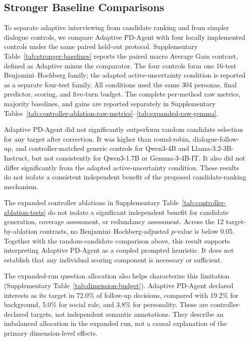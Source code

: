 \documentclass{ieeeaccess}
\begin{document}
\subsection{Stronger Baseline Comparisons}
To separate adaptive interviewing from candidate ranking and from simpler dialogue controls, we
compare Adaptive PD-Agent with four locally implemented controls under the same paired
held-out protocol. Supplementary Table~\ref{tab:stronger-baselines} reports the paired macro Average Gain
contrast, defined as Adaptive minus the comparator. The four controls form one
16-test Benjamini--Hochberg family; the adapted active-uncertainty condition is reported as a
separate four-test family. All conditions used the same 304 personas, final predictor, scoring,
and five-turn budget. The complete per-method raw metrics, majority baselines, and gains
are reported separately in Supplementary
Tables~\ref{tab:controller-ablation-raw-metrics}--\ref{tab:expanded-raw-gemma}.

Adaptive PD-Agent did not significantly outperform random candidate selection for any target
after correction. It was higher than round-robin, dialogue-follow-up, and
controller-matched generic controls for Qwen3-4B and Llama-3.2-3B-Instruct, but not
consistently for Qwen3-1.7B or Gemma-3-4B-IT. It also did not differ significantly from the
adapted active-uncertainty condition. These results do not isolate a consistent independent
benefit of the proposed candidate-ranking mechanism.

The expanded controller ablations in Supplementary Table~\ref{tab:controller-ablation-tests}
do not isolate a significant independent benefit for
candidate generation, coverage assessment, or redundancy assessment. Across the 12
target-by-ablation contrasts, no Benjamini--Hochberg-adjusted $p$-value is below 0.05.
Together with the random-candidate comparison above, this result supports interpreting
Adaptive PD-Agent as a coupled prompted heuristic. It does not establish that any
individual scoring component is necessary or sufficient.

The expanded-run question allocation also helps characterize this limitation
(Supplementary Table~\ref{tab:dimension-budget}). Adaptive PD-Agent declared interests
as its target in 72.0\% of follow-up decisions, compared with 19.2\% for background,
5.0\% for social role, and 3.8\% for personality. These are controller-declared targets,
not independent semantic annotations. They describe an imbalanced allocation in the
expanded run, not a causal explanation of the primary dimension-level effects.
\end{document}

